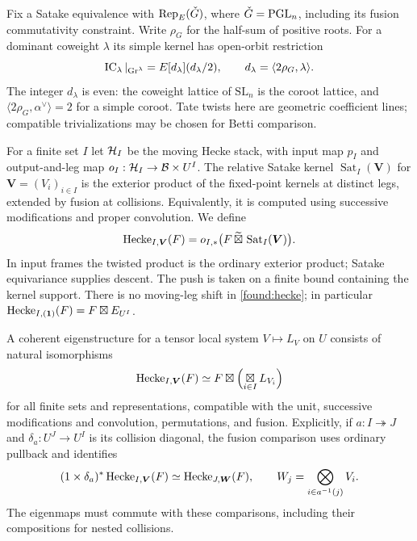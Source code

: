 Fix a Satake equivalence with $\operatorname{Rep}_E(\check G)$, where $\check G=\mathrm{PGL}_n$,
including its fusion commutativity constraint.  Write $\rho_G$ for the
half-sum of positive roots.  For a dominant
coweight $\lambda$ its simple kernel has open-orbit restriction
\begin{equation}\label{found:satake-normalization}
 \operatorname{IC}_\lambda|_{\operatorname{Gr}^\lambda}
       =E[d_\lambda](d_\lambda/2),\qquad
 d_\lambda=\langle 2\rho_G,\lambda\rangle.
\end{equation}
The integer $d_\lambda$ is even: the coweight lattice of $\mathrm{SL}_n$
is the coroot lattice, and $\langle2\rho_G,\alpha^\vee\rangle=2$ for a
simple coroot.  Tate twists here are geometric coefficient lines;
compatible trivializations may be chosen for Betti comparison.

For a finite set $I$ let $\mathcal H_I$ be the moving Hecke stack, with input
map $p_I$ and output-and-leg map $o_I:\mathcal H_I\to\mathcal B\times U^I$.
The relative Satake kernel $\operatorname{Sat}_I(\boldsymbol V)$ for
$\boldsymbol V=(V_i)_{i\in I}$ is the exterior product of the
fixed-point kernels at distinct legs, extended by fusion at collisions.
Equivalently, it is computed using successive modifications and proper
convolution.  We define
\begin{equation}\label{found:hecke}
 \operatorname{Hecke}_{I,\boldsymbol V}(F)
   =o_{I,*}\bigl(F\,\widetilde\boxtimes\,
                         \operatorname{Sat}_I(\boldsymbol V)\bigr).
\end{equation}
In input frames the twisted product is the ordinary exterior product;
Satake equivariance supplies descent.  The push is taken on a finite
bound containing the kernel support.  There is no moving-leg shift in
\eqref{found:hecke}; in particular
$\operatorname{Hecke}_{I,(\mathbf1)}(F)=F\boxtimes E_{U^I}$.

\begin{definition}\label{found:coherence}
A coherent eigenstructure for a tensor local system
$V\mapsto L_V$ on $U$ consists of natural isomorphisms
\[
 \operatorname{Hecke}_{I,\boldsymbol V}(F)
       \simeq F\boxtimes\Bigl(\mathop{\boxtimes}_{i\in I}L_{V_i}\Bigr)
\]
for all finite sets and representations, compatible with the unit,
successive modifications and convolution, permutations, and fusion.
Explicitly, if $a:I\twoheadrightarrow J$ and
$\delta_a:U^J\to U^I$ is its collision diagonal, the fusion comparison
uses ordinary pullback and identifies
\[
 (1\times\delta_a)^*\operatorname{Hecke}_{I,\boldsymbol V}(F)
 \simeq\operatorname{Hecke}_{J,\boldsymbol W}(F),\qquad
 W_j=\bigotimes_{i\in a^{-1}(j)}V_i.
\]
The eigenmaps must commute with these comparisons, including their
compositions for nested collisions.
\end{definition}

